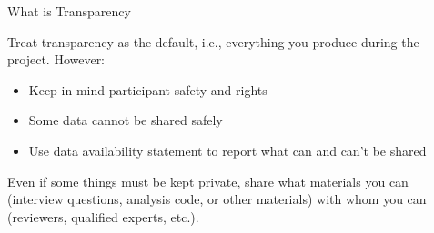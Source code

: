 \begin{block}{What is Transparency}
      
 
  

 
  
 
  
  Treat transparency as the default, i.e., everything you produce during the project. However:
\begin{itemize}
      \item Keep in mind participant safety and rights 
      \item Some data cannot be shared safely
      \item Use data availability statement to report what can and can't be shared
  \end{itemize} 
Even if some things must be kept private, share what materials you can (interview questions, analysis code, or other materials) with whom you can (reviewers, qualified experts, etc.). 
\end{block}

